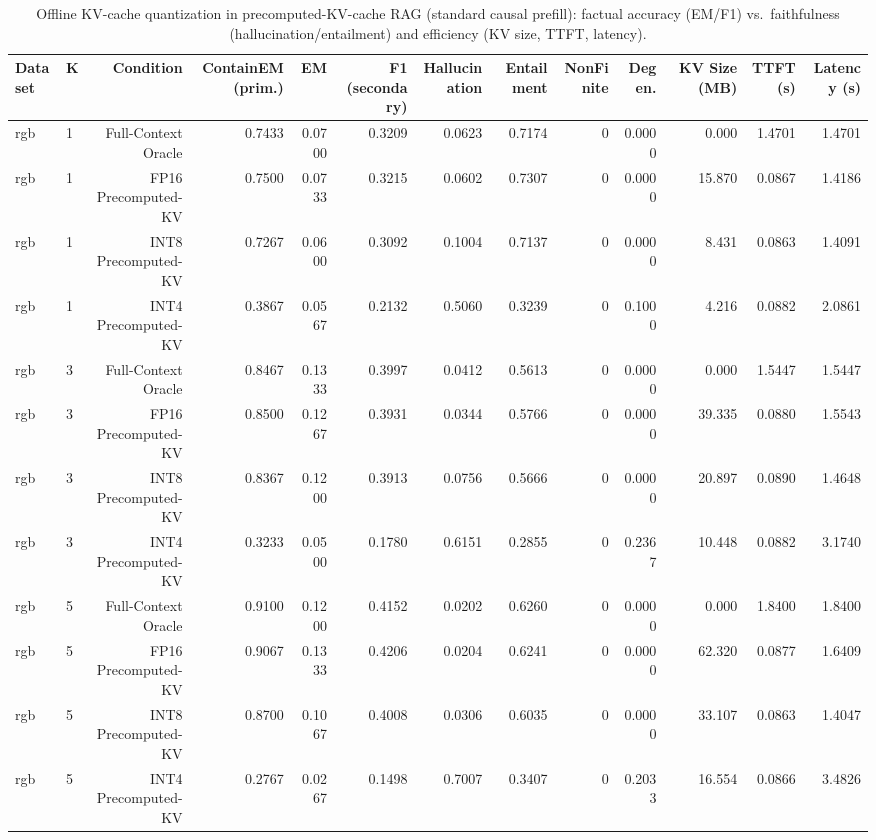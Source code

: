 \begin{table}[t]
\centering
\small
\begin{tabular}{llrrrrrrrrrrr}
\toprule
Dataset & K & Condition & ContainEM (prim.) & EM & F1 (secondary) & Hallucination & Entailment & NonFinite & Degen. & KV Size (MB) & TTFT (s) & Latency (s) \\
\midrule
rgb & 1 & Full-Context Oracle & 0.7433 & 0.0700 & 0.3209 & 0.0623 & 0.7174 & 0 & 0.0000 & 0.000 & 1.4701 & 1.4701 \\
rgb & 1 & FP16 Precomputed-KV & 0.7500 & 0.0733 & 0.3215 & 0.0602 & 0.7307 & 0 & 0.0000 & 15.870 & 0.0867 & 1.4186 \\
rgb & 1 & INT8 Precomputed-KV & 0.7267 & 0.0600 & 0.3092 & 0.1004 & 0.7137 & 0 & 0.0000 & 8.431 & 0.0863 & 1.4091 \\
rgb & 1 & INT4 Precomputed-KV & 0.3867 & 0.0567 & 0.2132 & 0.5060 & 0.3239 & 0 & 0.1000 & 4.216 & 0.0882 & 2.0861 \\
rgb & 3 & Full-Context Oracle & 0.8467 & 0.1333 & 0.3997 & 0.0412 & 0.5613 & 0 & 0.0000 & 0.000 & 1.5447 & 1.5447 \\
rgb & 3 & FP16 Precomputed-KV & 0.8500 & 0.1267 & 0.3931 & 0.0344 & 0.5766 & 0 & 0.0000 & 39.335 & 0.0880 & 1.5543 \\
rgb & 3 & INT8 Precomputed-KV & 0.8367 & 0.1200 & 0.3913 & 0.0756 & 0.5666 & 0 & 0.0000 & 20.897 & 0.0890 & 1.4648 \\
rgb & 3 & INT4 Precomputed-KV & 0.3233 & 0.0500 & 0.1780 & 0.6151 & 0.2855 & 0 & 0.2367 & 10.448 & 0.0882 & 3.1740 \\
rgb & 5 & Full-Context Oracle & 0.9100 & 0.1200 & 0.4152 & 0.0202 & 0.6260 & 0 & 0.0000 & 0.000 & 1.8400 & 1.8400 \\
rgb & 5 & FP16 Precomputed-KV & 0.9067 & 0.1333 & 0.4206 & 0.0204 & 0.6241 & 0 & 0.0000 & 62.320 & 0.0877 & 1.6409 \\
rgb & 5 & INT8 Precomputed-KV & 0.8700 & 0.1067 & 0.4008 & 0.0306 & 0.6035 & 0 & 0.0000 & 33.107 & 0.0863 & 1.4047 \\
rgb & 5 & INT4 Precomputed-KV & 0.2767 & 0.0267 & 0.1498 & 0.7007 & 0.3407 & 0 & 0.2033 & 16.554 & 0.0866 & 3.4826 \\
\bottomrule
\end{tabular}
\caption{Offline KV-cache quantization in precomputed-KV-cache RAG (standard causal prefill): factual accuracy (EM/F1) vs.\ faithfulness (hallucination/entailment) and efficiency (KV size, TTFT, latency).}
\label{tab:main}
\end{table}
